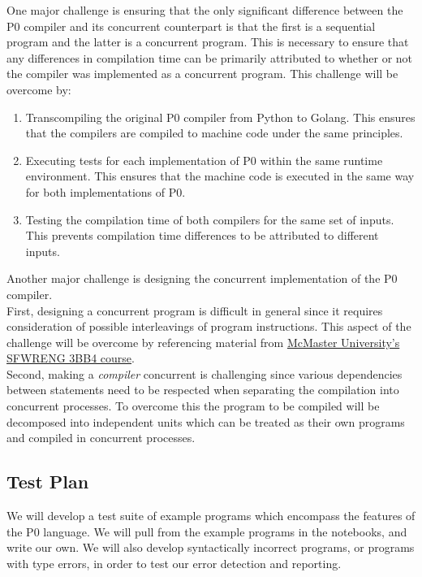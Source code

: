 \documentclass{article}
\begin{document}
One major challenge is ensuring that the only significant difference between the P0 compiler
and its concurrent counterpart is that the first is a sequential program and the
latter is a concurrent program. This is necessary to ensure that any differences in compilation time can be primarily attributed to whether or not the compiler was implemented as a concurrent program. This challenge will be overcome by:
\begin{enumerate}
	\item Transcompiling the original P0 compiler from Python to Golang. This ensures that the
	compilers are compiled to machine code under the same principles.
	\item Executing tests for each implementation of P0 within the same runtime environment. This ensures that the machine code
	is executed in the same way for both implementations of P0.
	\item Testing the compilation time of both compilers for the same set of inputs. This prevents
	compilation time differences to be attributed to different inputs.
\end{enumerate}
\bigskip
Another major challenge is designing the concurrent implementation of the P0 compiler.\\
First, designing a concurrent program is difficult in general since it requires consideration of possible interleavings of program instructions. This aspect of the challenge will be overcome by referencing  material from \href{https://www.cas.mcmaster.ca/~se3bb4/}{McMaster University's SFWRENG 3BB4 course}.\\
Second, making a \textit{compiler} concurrent is challenging since various dependencies between statements need to be respected when separating the compilation into concurrent processes. To overcome this the program to be compiled will be decomposed into independent units which can be treated as their own programs and compiled in concurrent processes.

\subsection{Test Plan}

We will develop a test suite of example programs which encompass the features of
the P0 language. We will pull from the example programs in the notebooks, and
write our own.
We will also develop syntactically incorrect programs, or programs with type
errors, in order to test our error detection and reporting.
\end{document}
